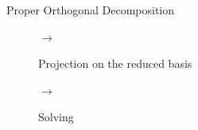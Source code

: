 \documentclass[10pt,a4paper]{beamer}
\begin{document}
\begin{frame}{Proper Orthogonal Decomposition}
\begin{figure}
\begin{minipage}{0.03\linewidth}
	   		$\rightarrow$
	   \end{minipage}\hfill
	   \begin{minipage}{0.22\linewidth}
			\begin{exampleblock}{}
				\centering		
				Projection on the reduced basis
			\end{exampleblock}
	   \end{minipage}\hfill
	   \begin{minipage}{0.03\linewidth}
			\vspace{0.220cm}
	   		$\rightarrow$
	   \end{minipage}\hfill
	   \begin{minipage}{0.22\linewidth}
			\begin{exampleblock}{}
				\centering		
				\vspace{0.21cm}
				Solving
				\vspace{0.22cm}
			\end{exampleblock}
	   \end{minipage}
	\end{figure}
		
\end{frame}

\end{document}
